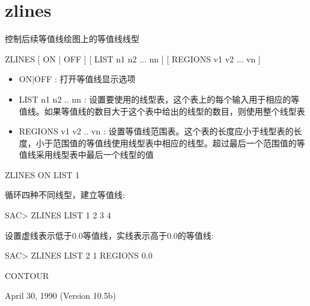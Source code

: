 \section{zlines}
\label{cmd:zlines}

控制后续等值线绘图上的等值线线型

ZLINES  [ ON | OFF ] [ LIST n1 n2 ... nn ] [ REGIONS v1 v2 ... vn ]

\begin{itemize}
\item ON|OFF : 打开等值线显示选项 
\item LIST n1 n2 .. nn : 设置要使用的线型表，这个表上的每个输入用于相应的等值线。如果等值线的数目大于这个表中给出的线型的数目，则使用整个线型表 
\item REGIONS v1 v2 .. vn : 设置等值线范围表。这个表的长度应小于线型表的长度，小于范围值的等值线使用线型表中相应的线型。超过最后一个范围值的等值线采用线型表中最后一个线型的值
\end{itemize}

ZLINES ON LIST 1

循环四种不同线型，建立等值线:
\begin{SACCode}
SAC> ZLINES LIST 1 2 3 4
\end{SACCode}

设置虚线表示低于0.0等值线，实线表示高于0.0的等值线:
\begin{SACCode}
SAC> ZLINES LIST 2 1 REGIONS 0.0
\end{SACCode}

CONTOUR

April 30, 1990 (Version 10.5b)
